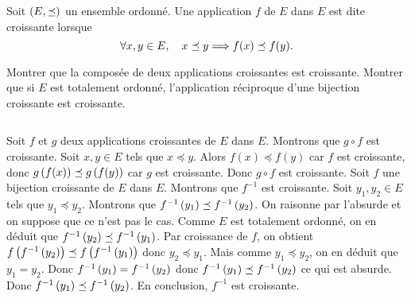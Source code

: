 \documentclass{magnolia}
\begin{document}
Soit $\left(E,\preceq\right)$ un ensemble ordonné. Une application $f$ de $E$ dans $E$
est dite croissante lorsque
\[\forall x,y\in E ,\quad x\preceq y \Longrightarrow f(x)\preceq f(y).\]
\begin{questions}
\question Montrer que la composée de deux applications croissantes est
  croissante.
\question Montrer que si $E$ est totalement ordonné, l'application réciproque
  d'une bijection croissante est croissante.
\end{questions}
\begin{sol}
$\quad$
\begin{questions}
\question Soit $f$ et $g$ deux applications croissantes de $E$ dans $E$. Montrons
  que $g\circ f$ est croissante. Soit $x,y\in E$ tels que $x\preceq y$. Alors
  $f(x)\preceq f(y)$ car $f$ est croissante, donc
  $g\left(f(x)\right)\preceq g\left(f(y)\right)$ car $g$ est croissante. Donc $g\circ f$
  est croissante.
\question Soit $f$ une bijection croissante de $E$ dans $E$. Montrons que $f^{-1}$
  est croissante. Soit $y_1,y_2\in E$ tels que $y_1\preceq y_2$. Montrons que
  $f^{-1}\left(y_1\right)\preceq f^{-1}\left(y_2\right)$. On raisonne par l'absurde et on suppose
  que ce n'est pas le cas. Comme $E$ est totalement ordonné, on en déduit que
  $f^{-1}\left(y_2\right)\preceq f^{-1}\left(y_1\right)$. Par croissance de $f$, on obtient
  $f\left(f^{-1}\left(y_2\right)\right)\preceq f\left(f^{-1}\left(y_1\right)\right)$ donc $y_2\preceq y_1$. Mais
  comme $y_1\preceq y_2$, on en déduit que $y_1=y_2$. Donc
  $f^{-1}\left(y_1\right)=f^{-1}\left(y_2\right)$ donc $f^{-1}\left(y_1\right)\preceq f^{-1}\left(y_2\right)$ ce qui est
  absurde. Donc $f^{-1}\left(y_1\right)\preceq f^{-1}\left(y_2\right)$. En conclusion, $f^{-1}$ est
  croissante.
\end{questions}
\end{sol}



\end{document}
